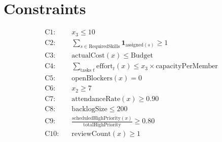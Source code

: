 \documentclass{article}
\begin{document}
\section*{Constraints}
\begin{align}
\text{C1:}\quad & x_3 \le 10 \\
\text{C2:}\quad & \sum_{s \in \text{RequiredSkills}} \mathbf{1}_{\text{assigned}(s)} \ge 1 \\
\text{C3:}\quad & \text{actualCost}(x) \le \text{Budget} \\
\text{C4:}\quad & \sum_{\text{tasks } t} \text{effort}_t(x) \le x_3 \times \text{capacityPerMember} \\
\text{C5:}\quad & \text{openBlockers}(x) = 0 \\
\text{C6:}\quad & x_2 \ge 7 \\
\text{C7:}\quad & \text{attendanceRate}(x) \ge 0.90 \\
\text{C8:}\quad & \text{backlogSize} \le 200 \\
\text{C9:}\quad & \frac{\text{scheduledHighPriority}(x)}{\text{totalHighPriority}} \ge 0.80 \\
\text{C10:}\quad & \text{reviewCount}(x) \ge 1
\end{align}
\end{document}

